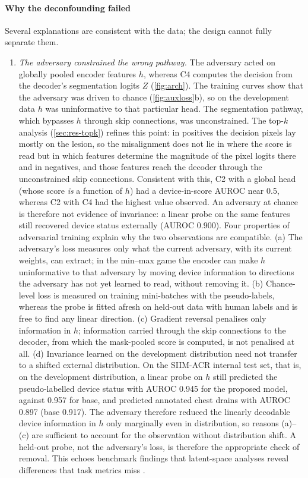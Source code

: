 \documentclass{ieeeaccess}
\begin{document}
\paragraph{Why the deconfounding failed}
Several explanations are consistent with the data; the design cannot fully separate them.
\begin{enumerate}
  \item \emph{The adversary constrained the wrong pathway.} The adversary acted on globally pooled encoder features $h$, whereas C4 computes the decision from the decoder's segmentation logits $Z$ (\cref{fig:arch}). The training curves show that the adversary was driven to chance (\cref{fig:auxloss}b), so on the development data $h$ was uninformative to that particular head. The segmentation pathway, which bypasses $h$ through skip connections, was unconstrained. The top-$k$ analysis (\cref{sec:res-topk}) refines this point: in positives the decision pixels lay mostly on the lesion, so the misalignment does not lie in where the score is read but in which features determine the magnitude of the pixel logits there and in negatives, and those features reach the decoder through the unconstrained skip connections. Consistent with this, C2 with a global head (whose score \emph{is} a function of $h$) had a device-in-score AUROC near 0.5, whereas C2 with C4 had the highest value observed. An adversary at chance is therefore not evidence of invariance: a linear probe on the same features still recovered device status externally (AUROC 0.900). Four properties of adversarial training explain why the two observations are compatible. (a) The adversary's loss measures only what the current adversary, with its current weights, can extract; in the min--max game the encoder can make $h$ uninformative to that adversary by moving device information to directions the adversary has not yet learned to read, without removing it. (b) Chance-level loss is measured on training mini-batches with the pseudo-labels, whereas the probe is fitted afresh on held-out data with human labels and is free to find any linear direction. (c) Gradient reversal penalises only information in $h$; information carried through the skip connections to the decoder, from which the mask-pooled score is computed, is not penalised at all. (d) Invariance learned on the development distribution need not transfer to a shifted external distribution. On the SIIM-ACR internal test set, that is, on the development distribution, a linear probe on $h$ still predicted the pseudo-labelled device status with AUROC 0.945 for the proposed model, against 0.957 for base, and predicted annotated chest drains with AUROC 0.897 (base 0.917). The adversary therefore reduced the linearly decodable device information in $h$ only marginally even in distribution, so reasons (a)--(c) are sufficient to account for the observation without distribution shift. A held-out probe, not the adversary's loss, is therefore the appropriate check of removal. This echoes benchmark findings that latent-space analyses reveal differences that task metrics miss \cite{muller2026disentangle}.

\end{enumerate}
\end{document}
